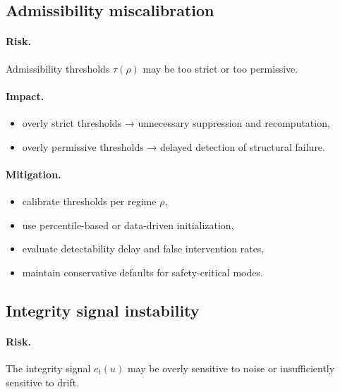 \documentclass[11pt,letterpaper]{article}
\theoremstyle{gcresult}
\theoremstyle{definition}
\begin{document}

\subsection{Admissibility miscalibration}

\paragraph{Risk.}
Admissibility thresholds $\tau(\rho)$ may be too strict or too permissive.

\paragraph{Impact.}
\begin{itemize}[leftmargin=1.5em]
    \item overly strict thresholds → unnecessary suppression and recomputation,
    \item overly permissive thresholds → delayed detection of structural failure.
\end{itemize}

\paragraph{Mitigation.}
\begin{itemize}[leftmargin=1.5em]
    \item calibrate thresholds per regime $\rho$,
    \item use percentile-based or data-driven initialization,
    \item evaluate detectability delay and false intervention rates,
    \item maintain conservative defaults for safety-critical modes.
\end{itemize}


\subsection{Integrity signal instability}

\paragraph{Risk.}
The integrity signal $e_t(u)$ may be overly sensitive to noise or insufficiently sensitive to drift.
\end{document}
